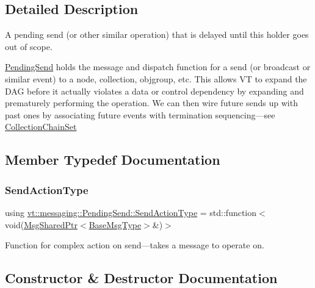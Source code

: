 \subsection{Detailed Description}
A pending send (or other similar operation) that is delayed until this holder goes out of scope. 

{\ttfamily \hyperlink{structvt_1_1messaging_1_1_pending_send}{Pending\+Send}} holds the message and dispatch function for a send (or broadcast or similar event) to a node, collection, objgroup, etc. This allows VT to expand the D\+AG before it actually violates a data or control dependency by expanding and prematurely performing the operation. We can then wire future sends up with past ones by associating future events with termination sequencing---see {\ttfamily \hyperlink{classvt_1_1messaging_1_1_collection_chain_set}{Collection\+Chain\+Set}} 

\subsection{Member Typedef Documentation}
\mbox{\label{structvt_1_1messaging_1_1_pending_send_aa13248a342d68230048cde8e0756851c}} 
\subsubsection{\texorpdfstring{Send\+Action\+Type}{SendActionType}}
{\footnotesize\ttfamily using \hyperlink{structvt_1_1messaging_1_1_pending_send_aa13248a342d68230048cde8e0756851c}{vt\+::messaging\+::\+Pending\+Send\+::\+Send\+Action\+Type} =  std\+::function$<$void(\hyperlink{structvt_1_1messaging_1_1_msg_shared_ptr}{Msg\+Shared\+Ptr}$<$\hyperlink{namespacevt_a44d0d4e144748f2b19a1cfd962f50338}{Base\+Msg\+Type}$>$\&)$>$}



Function for complex action on send---takes a message to operate on. 



\subsection{Constructor \& Destructor Documentation}
\mbox{\label{structvt_1_1messaging_1_1_pending_send_a7ea1d6401329b5f2a1f2f4ca8d4fed40}} 
